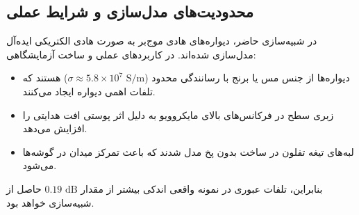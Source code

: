 \documentclass[11pt,a4paper]{article}
\begin{document}
\subsection{محدودیت‌های مدل‌سازی و شرایط عملی}
در شبیه‌سازی حاضر، دیواره‌های هادی موج‌بر به صورت هادی الکتریکی ایده‌آل  مدل‌سازی شده‌اند. در کاربردهای عملی و ساخت آزمایشگاهی:
\begin{itemize}
    \item دیواره‌ها از جنس مس یا برنج با رسانندگی محدود ($\sigma \approx 5.8 \times 10^7\text{ S/m}$) هستند که تلفات اهمی دیواره ایجاد می‌کنند.
    \item زبری سطح  در فرکانس‌های بالای مایکروویو به دلیل اثر پوستی  افت هدایتی را افزایش می‌دهد.
    \item لبه‌های تیغه تفلون در ساخت بدون پخ  مدل شدند که باعث تمرکز میدان در گوشه‌ها می‌شود.
\end{itemize}
بنابراین، تلفات عبوری در نمونه واقعی اندکی بیشتر از مقدار $0.19\text{ dB}$ حاصل از شبیه‌سازی خواهد بود.
\end{document}
